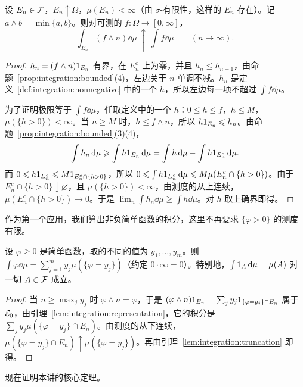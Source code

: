\begin{lemma}\label{lem:integration:truncation}
设 $E_n\in\mathcal{F}$，$E_n\uparrow\Omega$，$\mu(E_n)<\infty$（由 $\sigma$-有限性，这样的 $E_n$ 存在）。记 $a\wedge b=\min\{a,b\}$。则对可测的 $f:\Omega\to[0,\infty]$，
\[
\int_{E_n}(f\wedge n)\dd\mu\ \uparrow\ \int f\dd\mu\qquad(n\to\infty).
\]
\end{lemma}
\begin{proof}
$h_n=(f\wedge n)1_{E_n}$ 有界，在 $E_n^c$ 上为零，并且 $h_n\leqslant h_{n+1}$，由命题~\ref{prop:integration:bounded}(4)，左边关于 $n$ 单调不减。$h_n$ 是定义~\ref{def:integration:nonnegative} 中的一个 $h$，所以左边每一项不超过 $\int f\dd\mu$。

为了证明极限等于 $\int f\dd\mu$，任取定义中的一个 $h$：$0\leqslant h\leqslant f$，$h\leqslant M$，$\mu(\{h>0\})<\infty$。当 $n\geqslant M$ 时，$h\leqslant f\wedge n$，所以 $h1_{E_n}\leqslant h_n$。由命题~\ref{prop:integration:bounded}(3)(4)，
\[
\int h_n\,\mathrm{d}\mu\geqslant\int h1_{E_n}\,\mathrm{d}\mu=\int h\,\mathrm{d}\mu-\int h1_{E_n^c}\,\mathrm{d}\mu .
\]
而 $0\leqslant h1_{E_n^c}\leqslant M1_{E_n^c\cap\{h>0\}}$，所以 $0\leqslant\int h1_{E_n^c}\,\mathrm{d}\mu\leqslant M\mu(E_n^c\cap\{h>0\})$。由于 $E_n^c\cap\{h>0\}\downarrow\varnothing$，且 $\mu(\{h>0\})<\infty$，由测度的从上连续，$\mu(E_n^c\cap\{h>0\})\to0$。于是 $\lim_n\int h_n\dd\mu\geqslant\int h\dd\mu$。对 $h$ 取上确界即得。
\end{proof}

作为第一个应用，我们算出非负简单函数的积分，这里不再要求 $\{\varphi>0\}$ 的测度有限。

\begin{corollary}\label{cor:integration:nonnegative-simple}
设 $\varphi\geqslant0$ 是简单函数，取的不同的值为 $y_1,\dots,y_m$。则 $\int\varphi\dd\mu=\sum_{j=1}^my_j\mu(\{\varphi=y_j\})$（约定 $0\cdot\infty=0$）。特别地，$\int1_A\,\mathrm{d}\mu=\mu(A)$ 对一切 $A\in\mathcal{F}$ 成立。
\end{corollary}
\begin{proof}
当 $n\geqslant\max_jy_j$ 时 $\varphi\wedge n=\varphi$，于是 $(\varphi\wedge n)1_{E_n}=\sum_jy_j1_{\{\varphi=y_j\}\cap E_n}$ 属于 $\mathcal{E}_0$，由引理~\ref{lem:integration:representation}，它的积分是 $\sum_jy_j\mu(\{\varphi=y_j\}\cap E_n)$。由测度的从下连续，$\mu(\{\varphi=y_j\}\cap E_n)\uparrow\mu(\{\varphi=y_j\})$。再由引理~\ref{lem:integration:truncation} 即得。
\end{proof}


现在证明本讲的核心定理。

